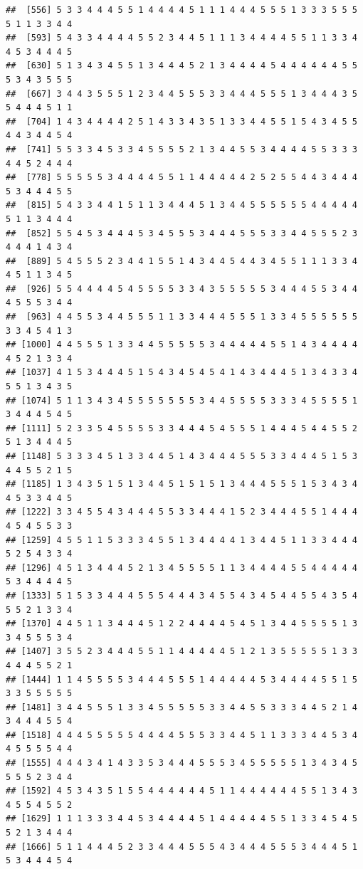 \documentclass[
]{book}
\begin{document}
\begin{verbatim}
##  [556] 5 3 3 4 4 4 5 5 1 4 4 4 4 5 1 1 1 4 4 4 5 5 5 1 3 3 3 5 5 5 5 1 1 3 3 4 4
##  [593] 5 4 3 3 4 4 4 4 5 5 2 3 4 4 5 1 1 1 3 4 4 4 4 5 5 1 1 3 3 4 4 5 3 4 4 4 5
##  [630] 5 1 3 4 3 4 5 5 1 3 4 4 4 5 2 1 3 4 4 4 4 5 4 4 4 4 4 4 5 5 5 3 4 3 5 5 5
##  [667] 3 4 4 3 5 5 5 1 2 3 4 4 5 5 5 3 3 4 4 4 5 5 5 1 3 4 4 4 3 5 5 4 4 4 5 1 1
##  [704] 1 4 3 4 4 4 4 2 5 1 4 3 3 4 3 5 1 3 3 4 4 5 5 1 5 4 3 4 5 5 4 4 3 4 4 5 4
##  [741] 5 5 3 3 4 5 3 3 4 5 5 5 5 2 1 3 4 4 5 5 3 4 4 4 4 5 5 3 3 3 4 4 5 2 4 4 4
##  [778] 5 5 5 5 5 3 4 4 4 4 5 5 1 1 4 4 4 4 4 2 5 2 5 5 4 4 3 4 4 4 5 3 4 4 4 5 5
##  [815] 5 4 3 3 4 4 1 5 1 1 3 4 4 4 5 1 3 4 4 5 5 5 5 5 5 4 4 4 4 4 5 1 1 3 4 4 4
##  [852] 5 5 4 5 3 4 4 4 5 3 4 5 5 5 3 4 4 4 5 5 5 3 3 4 4 5 5 5 2 3 4 4 4 1 4 3 4
##  [889] 5 4 5 5 5 2 3 4 4 1 5 5 1 4 3 4 4 5 4 4 3 4 5 5 1 1 1 3 3 4 4 5 1 1 3 4 5
##  [926] 5 5 4 4 4 4 5 4 5 5 5 5 3 3 4 3 5 5 5 5 5 3 4 4 4 5 5 3 4 4 4 5 5 5 3 4 4
##  [963] 4 4 5 5 3 4 4 5 5 5 1 1 3 3 4 4 4 5 5 5 1 3 3 4 5 5 5 5 5 5 3 3 4 5 4 1 3
## [1000] 4 4 5 5 5 1 3 3 4 4 5 5 5 5 5 3 4 4 4 4 4 5 5 1 4 3 4 4 4 4 4 5 2 1 3 3 4
## [1037] 4 1 5 3 4 4 4 5 1 5 4 3 4 5 4 5 4 1 4 3 4 4 4 5 1 3 4 3 3 4 5 5 1 3 4 3 5
## [1074] 5 1 1 3 4 3 4 5 5 5 5 5 5 5 3 4 4 5 5 5 5 3 3 3 4 5 5 5 5 1 3 4 4 4 5 4 5
## [1111] 5 2 3 3 5 4 5 5 5 5 3 3 4 4 4 5 4 5 5 5 1 4 4 4 5 4 4 5 5 2 5 1 3 4 4 4 5
## [1148] 5 3 3 3 4 5 1 3 3 4 4 5 1 4 3 4 4 4 5 5 5 3 3 4 4 4 5 1 5 3 4 4 5 5 2 1 5
## [1185] 1 3 4 3 5 1 5 1 3 4 4 5 1 5 1 5 1 3 4 4 4 5 5 5 1 5 3 4 3 4 4 5 3 3 4 4 5
## [1222] 3 3 4 5 5 4 3 4 4 4 5 5 3 3 4 4 4 1 5 2 3 4 4 4 5 5 1 4 4 4 4 5 4 5 5 3 3
## [1259] 4 5 5 1 1 5 3 3 3 4 5 5 1 3 4 4 4 4 1 3 4 4 5 1 1 3 3 4 4 4 5 2 5 4 3 3 4
## [1296] 4 5 1 3 4 4 4 5 2 1 3 4 5 5 5 5 1 1 3 4 4 4 4 5 5 4 4 4 4 4 5 3 4 4 4 4 5
## [1333] 5 1 5 3 3 4 4 4 5 5 5 4 4 4 3 4 5 5 4 3 4 5 4 4 5 5 4 3 5 4 5 5 2 1 3 3 4
## [1370] 4 4 5 1 1 3 4 4 4 5 1 2 2 4 4 4 4 5 4 5 1 3 4 4 5 5 5 5 1 3 3 4 5 5 5 3 4
## [1407] 3 5 5 2 3 4 4 4 5 5 1 1 4 4 4 4 4 5 1 2 1 3 5 5 5 5 5 1 3 3 4 4 4 5 5 2 1
## [1444] 1 1 4 5 5 5 5 3 4 4 4 5 5 5 1 4 4 4 4 4 5 3 4 4 4 4 5 5 1 5 3 3 5 5 5 5 5
## [1481] 3 4 4 5 5 5 1 3 3 4 5 5 5 5 5 3 3 4 4 5 5 3 3 3 4 4 5 2 1 4 3 4 4 4 5 5 4
## [1518] 4 4 4 5 5 5 5 5 4 4 4 4 5 5 5 3 3 4 4 5 1 1 3 3 3 4 4 5 3 4 4 5 5 5 5 4 4
## [1555] 4 4 4 3 4 1 4 3 3 5 3 4 4 4 5 5 5 3 4 5 5 5 5 5 1 3 4 3 4 5 5 5 5 2 3 4 4
## [1592] 4 5 3 4 3 5 1 5 5 4 4 4 4 4 4 5 1 1 4 4 4 4 4 4 5 5 1 3 4 3 4 5 5 4 5 5 2
## [1629] 1 1 1 3 3 3 4 4 5 3 4 4 4 4 5 1 4 4 4 4 4 5 5 1 3 3 4 5 4 5 5 2 1 3 4 4 4
## [1666] 5 1 1 4 4 4 5 2 3 3 4 4 4 5 5 5 4 3 4 4 4 5 5 5 3 4 4 4 5 1 5 3 4 4 4 5 4

\end{verbatim}
\end{document}
